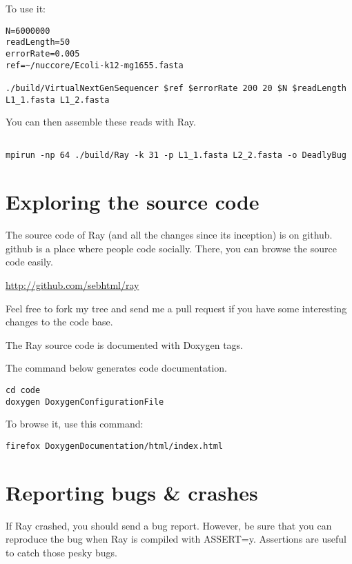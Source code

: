 \documentclass{article}
\begin{document}
To use it:

\begin{verbatim}
N=6000000
readLength=50
errorRate=0.005
ref=~/nuccore/Ecoli-k12-mg1655.fasta

./build/VirtualNextGenSequencer $ref $errorRate 200 20 $N $readLength L1_1.fasta L1_2.fasta
\end{verbatim}

You can then assemble these reads with Ray.

\begin{verbatim}

mpirun -np 64 ./build/Ray -k 31 -p L1_1.fasta L2_2.fasta -o DeadlyBug

\end{verbatim}

\section{Exploring the source code}

The source code of Ray (and all the changes since its inception) is on github.
github is a place where people code socially.
There, you can browse the source code easily.

\href{http://github.com/sebhtml/ray}{http://github.com/sebhtml/ray}

Feel free to fork my tree and send me a pull request if you have some
interesting changes to the code base.

The Ray source code is documented with Doxygen tags.

The command below generates code documentation.

\begin{verbatim}
cd code
doxygen DoxygenConfigurationFile
\end{verbatim}

To browse it, use this command:

\begin{verbatim}
firefox DoxygenDocumentation/html/index.html
\end{verbatim}

\section{Reporting bugs \& crashes}

If Ray crashed, you should send a bug report.
However, be sure that you can reproduce the bug when Ray is compiled with
ASSERT=y. Assertions are useful to catch those pesky bugs.
\end{document}
